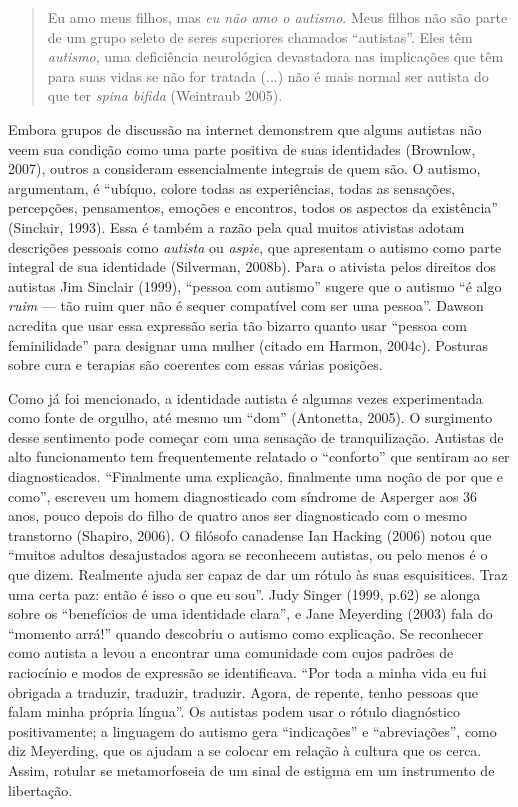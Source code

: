 \begin{quote}
Eu amo meus filhos, mas \emph{eu não amo o autismo}. Meus filhos não são
parte de um grupo seleto de seres superiores chamados ``autistas''. Eles
têm \emph{autismo}, uma deficiência neurológica devastadora nas
implicações que têm para suas vidas se não for tratada (...) não é mais
normal ser autista do que ter \emph{spina bifida} (Weintraub 2005).
\end{quote}

Embora grupos de discussão na internet demonstrem que alguns autistas
não veem sua condição como uma parte positiva de suas identidades
(Brownlow, 2007), outros a consideram essencialmente integrais de quem
são. O autismo, argumentam, é ``ubíquo, colore todas as experiências,
todas as sensações, percepções, pensamentos, emoções e encontros, todos
os aspectos da existência'' (Sinclair, 1993). Essa é também a razão pela
qual muitos ativistas adotam descrições pessoais como \emph{autista} ou
\emph{aspie}, que apresentam o autismo como parte integral de sua
identidade (Silverman, 2008b). Para o ativista pelos direitos dos
autistas Jim Sinclair (1999), ``pessoa com autismo'' sugere que o
autismo ``é algo \emph{ruim} --- tão ruim quer não é sequer compatível
com ser uma pessoa''. Dawson acredita que usar essa expressão seria tão
bizarro quanto usar ``pessoa com feminilidade'' para designar uma mulher
(citado em Harmon, 2004c). Posturas sobre cura e terapias são coerentes
com essas várias posições.

Como já foi mencionado, a identidade autista é algumas vezes
experimentada como fonte de orgulho, até mesmo um ``dom'' (Antonetta,
2005). O surgimento desse sentimento pode começar com uma sensação de
tranquilização. Autistas de alto funcionamento tem frequentemente
relatado o ``conforto'' que sentiram ao ser diagnosticados. ``Finalmente
uma explicação, finalmente uma noção de por que e como'', escreveu um
homem diagnosticado com síndrome de Asperger aos 36 anos, pouco depois
do filho de quatro anos ser diagnosticado com o mesmo transtorno
(Shapiro, 2006). O filósofo canadense Ian Hacking (2006) notou que
``muitos adultos desajustados agora se reconhecem autistas, ou pelo
menos é o que dizem. Realmente ajuda ser capaz de dar um rótulo às suas
esquisitices. Traz uma certa paz: então é isso o que eu sou''. Judy
Singer (1999, p.62) se alonga sobre os ``benefícios de uma identidade
clara'', e Jane Meyerding (2003) fala do ``momento arrá!'' quando
descobriu o autismo como explicação. Se reconhecer como autista a levou
a encontrar uma comunidade com cujos padrões de raciocínio e modos de
expressão se identificava. ``Por toda a minha vida eu fui obrigada a
traduzir, traduzir, traduzir. Agora, de repente, tenho pessoas que falam
minha própria língua''. Os autistas podem usar o rótulo diagnóstico
positivamente; a linguagem do autismo gera ``indicações'' e
``abreviações'', como diz Meyerding, que os ajudam a se colocar em
relação à cultura que os cerca. Assim, rotular se metamorfoseia de um
sinal de estigma em um instrumento de libertação.

